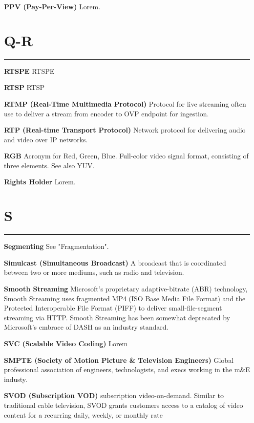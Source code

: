 \smallskip
\textbf{PPV (Pay-Per-View)}
Lorem.


\section{Q-R}
\hrule

\medskip
\textbf{RTSPE}
RTSPE

\smallskip
\textbf{RTSP}
RTSP

\smallskip
\textbf{RTMP (Real-Time Multimedia Protocol)}
Protocol for live streaming often use to deliver a stream from encoder to OVP endpoint for ingestion.

\smallskip
\textbf{RTP (Real-time Transport Protocol)}
Network protocol for delivering audio and video over IP networks.

\smallskip
\textbf{RGB}
Acronym for Red, Green, Blue. Full-color video signal format, consisting of three elements. See also YUV.

\smallskip
\textbf{Rights Holder}
Lorem.

\section{S}
\hrule

\medskip
\textbf{Segmenting}
See "Fragmentation".

\smallskip
\textbf{Simulcast (Simultaneous Broadcast)}
A broadcast that is coordinated between two or more mediums, such as radio and television.

\smallskip
\textbf{Smooth Streaming}
Microsoft’s proprietary adaptive-bitrate (ABR) technology, Smooth Streaming uses fragmented MP4 (ISO Base Media File Format) and the Protected Interoperable File Format (PIFF) to deliver small-file-segment streaming via HTTP. Smooth Streaming has been somewhat deprecated by Microsoft’s embrace of DASH as an industry standard.

\smallskip
\textbf{SVC (Scalable Video Coding)}
Lorem

\smallskip
\textbf{SMPTE (Society of Motion Picture \& Television Engineers)}
Global professional association of engineers, technologists, and execs working in the m\&E industy.

\smallskip
\textbf{SVOD (Subscription VOD)}
subscription video-on-demand. Similar to traditional cable television, SVOD grants customers access to a catalog of video content for a recurring daily, weekly, or monthly rate



